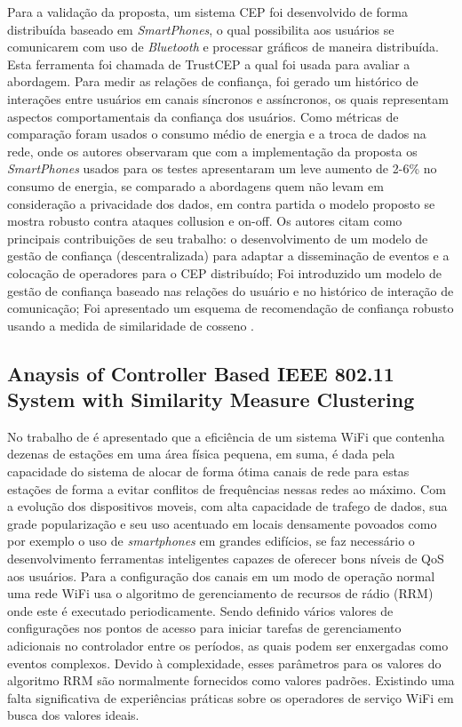\documentclass[ti,table]{texufpel} %
\begin{document}
	
	Para a validação da proposta, um sistema CEP foi desenvolvido de forma distribuída baseado em \textit{SmartPhones}, o qual possibilita aos usuários se comunicarem com uso de \textit{Bluetooth} e processar gráficos de maneira distribuída. Esta ferramenta foi chamada de TrustCEP a qual foi usada para avaliar a abordagem. Para medir as relações de confiança, foi gerado um histórico de interações entre usuários em canais síncronos e assíncronos, os quais representam aspectos comportamentais da confiança dos usuários. Como métricas de comparação foram usados o consumo médio de energia e a troca de dados na rede, onde os autores observaram que com a implementação da proposta os \textit{SmartPhones} usados para os testes apresentaram um leve aumento de 2-6\% no consumo de energia, se comparado a abordagens quem não levam em consideração a privacidade dos dados, em contra partida o modelo proposto se mostra robusto contra ataques collusion e on-off.
	Os autores citam como principais contribuições de seu trabalho: o desenvolvimento de um modelo de gestão de confiança (descentralizada) para adaptar a disseminação de eventos e a colocação de operadores para o CEP distribuído; Foi introduzido um modelo de gestão de confiança baseado nas relações do usuário e no histórico de interação de comunicação; Foi apresentado um esquema de recomendação de confiança robusto usando a medida de similaridade de cosseno \cite{art6dwarakanath2017trustcep}.
	


\subsection{Anaysis of Controller Based IEEE 802.11 System with Similarity Measure Clustering}


	No trabalho de \cite{art7gal2017anaysis} é apresentado que a eficiência de um sistema WiFi que contenha dezenas de estações em uma área física pequena, em suma, é dada pela capacidade do sistema de alocar de forma ótima canais de rede para estas estações de forma a evitar conflitos de frequências nessas redes ao máximo. Com a evolução dos dispositivos moveis, com alta capacidade de trafego de dados, sua grade popularização e seu uso acentuado em locais densamente povoados como por exemplo o uso de \textit{smartphones} em grandes edifícios, se faz necessário o desenvolvimento ferramentas inteligentes capazes de oferecer bons níveis de QoS aos usuários. Para a configuração dos canais em um modo de operação normal uma rede WiFi usa o algoritmo de gerenciamento de recursos de rádio (RRM) onde este é executado periodicamente. Sendo definido vários valores de configurações nos pontos de acesso para iniciar tarefas de gerenciamento adicionais no controlador entre os períodos, as quais podem ser enxergadas como eventos complexos. Devido à complexidade, esses parâmetros para os valores do algoritmo RRM são normalmente fornecidos como valores padrões. Existindo uma falta significativa de experiências práticas sobre os operadores de serviço WiFi em busca dos valores ideais.
	
\end{document}

